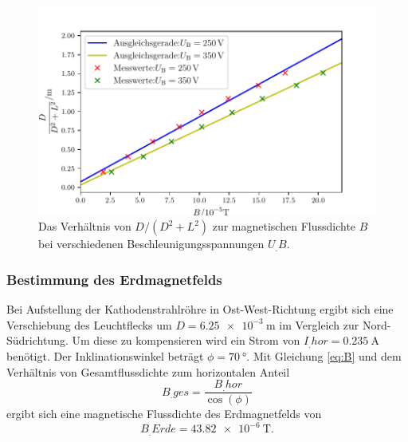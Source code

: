 \begin{figure}
\centering
\includegraphics[width=\linewidth-70pt,height=\textheight-70pt,keepaspectratio]{content/images/GraphMag1.pdf}
\caption{Das Verhältnis von $D/(D^2+L^2)$ zur magnetischen Flussdichte $B$ bei verschiedenen Beschleunigungsspannungen $U_.B$.}\label{fig:Mag}
\end{figure}
\subsubsection{Bestimmung des Erdmagnetfelds}
Bei Aufstellung der Kathodenstrahlröhre in Ost-West-Richtung ergibt sich eine Verschiebung des Leuchtflecks um $D=\SI{6,25e-3}{\metre}$ im Vergleich zur Nord-Südrichtung.
Um diese zu kompensieren wird ein Strom von $I_.{hor}=\SI{0,235}{\ampere}$ benötigt. Der Inklinationswinkel beträgt $\phi=\SI{70}{\degree}$. Mit Gleichung \eqref{eq:B}
und dem Verhältnis von Gesamtflussdichte zum horizontalen Anteil
\[
B_.{ges}= \frac{B_.{hor}}{\cos(\phi)}
\]
ergibt sich eine magnetische Flussdichte des Erdmagnetfelds von
\[
B_.{Erde}=\SI{43,82e-6}{\tesla}\text{.}
\]
